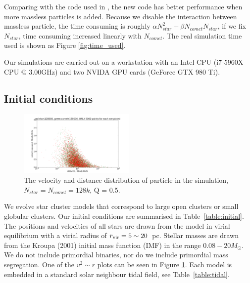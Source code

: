 \documentclass[usenatbib]{mn2e}
\newcommand{\rvir}{r_{\rm vir}}
\newcommand{\msun}{M_\odot}
\begin{document}
Comparing with the code used in \citep{Wang:2015ab}, the new code has better performance when more massless particles is added. Because we disable the interaction between massless particle, the time consuming is roughly $\alpha N_{star}^{2}+\beta N_{comet} N_{star}$, if we fix $N_{star}$, time consuming increased linearly with $N_{comet}$. The real simulation time used is shown as Figure \ref{fig:time_used}.


Our simulations are carried out on a workstation with an Intel CPU (i7-5960X CPU @ 3.00GHz) and two NVIDA GPU cards (GeForce GTX 980 Ti).

\subsection{Initial conditions}

\begin{figure}
  \centering
  \includegraphics[width=0.5\textwidth,height=!]{v2_r.png}
  \caption{The velocity and distance distribution of particle in the simulation, $N_{star} = N_{comet} = 128k$, Q = 0.5.}
  \label{fig:v2_r}
\end{figure}

We evolve star cluster models that correspond to large open clusters or small globular clusters. Our initial conditions are summarised in Table~\ref{table:initial}. The positions and velocities of all stars are drawn from the \cite{Plummer:1911aa} model in virial equilibrium with a virial radius of $\rvir=5 \sim 20$~pc. Stellar masses are drawn from the Kroupa (2001) initial mass function (IMF) in the range $0.08-20\msun$. We do not include primordial binaries, nor do we include primordial mass segregation. One of the $v^{2} \sim r$ plots can be seen in Figure \ref{fig:v2_r}. Each model is embedded in a standard solar neighbour tidal field, see Table~\ref{table:tidal}.
\end{document}
